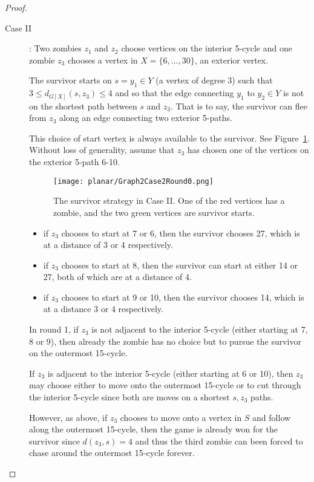 \begin{proof}
\begin{description}
\item[Case II \label{planar case 2}]: Two zombies $z_1$ and $z_2$ choose vertices on the interior 5-cycle and one zombie $z_3$ chooses a vertex in $X = \{ 6, \dots, 30 \}$,
an exterior vertex.

The survivor starts on $s = y_1 \in Y$  (a vertex of degree 3) such that $3 \leq d_{G[X]}(s, z_3) \leq 4$ and so that the edge connecting $y_1$ to $y_2 \in Y$
is not on the shortest path between $s$ and $z_3$. That is to say, the survivor can flee from $z_3$ along an edge connecting two exterior 5-paths.

This choice of start vertex is always available to the survivor. See Figure~\ref{fig:planarG2C2R0}. Without loss of generality, assume that $z_3$ has chosen one of the vertices on the
exterior 5-path 6-10.

\begin{figure}
\centering
\texttt{[image: planar/Graph2Case2Round0.png]}
\caption{The survivor strategy in Case II. One of the red vertices has a zombie, and the two green vertices are survivor starts. \label{fig:planarG2C2R0}}
\end{figure}

\begin{itemize}
\item if $z_3$ chooses to start at 7 or 6, then the survivor chooses 27, which is at a distance of 3 or 4 respectively.
\item if $z_3$ chooses to start at 8, then the survivor can start at either 14 or 27, both of which are at a distance of 4.
\item if $z_3$ chooses to start at 9 or 10, then the survivor chooses 14, which is at a distance 3 or 4 respectively.
\end{itemize}

In round 1, if $z_3$ is not adjacent to the interior 5-cycle (either starting at 7, 8 or 9), then already the zombie has no choice but to pursue the survivor
on the outermost 15-cycle.

If $z_3$ is adjacent to the interior 5-cycle (either starting at 6 or 10), then $z_3$ may choose either to move onto the outermost 15-cycle or to cut through the interior 5-cycle since both are moves on a shortest $s,z_3$ paths.

However, as above, if $z_3$ chooses to move onto a vertex in $S$ and follow along the outermost 15-cycle, then the game is already won for the survivor since
$d(z_3, s) = 4$ and thus the third zombie can been forced to chase around the outermost 15-cycle forever.


\end{description}
\end{proof}
